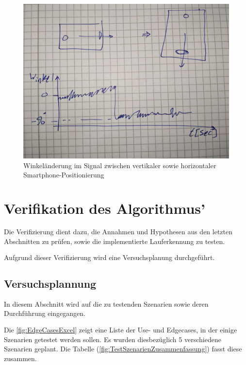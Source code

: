 \begin{figure}[H]
	\centering
	\includegraphics[width=\linewidth]{Bilder/SignalHorizontalUndVertikal.jpg}
	\caption{Winkeländerung im Signal zwischen vertikaler sowie horizontaler Smartphone-Positionierung}
	\label{fig:SignalHorizontalUndVertikal}
\end{figure}



\section{Verifikation des Algorithmus'}
Die Verifizierung dient dazu, die Annahmen und Hypothesen aus den letzten Abschnitten zu prüfen, sowie die implementierte Lauferkennung zu testen.


Aufgrund dieser Verifizierung wird eine Versuchsplanung durchgeführt. 
%
%
%
\subsection{Versuchsplannung}

In diesem Abschnitt wird auf die zu testenden Szenarien sowie deren Durchführung eingegangen.

Die \autoref{fig:EdgeCasesExcel} zeigt eine Liste der Use- und Edgecases, in der einige Szenarien getestet werden sollen. Es wurden diesbezüglich 5 verschiedene Szenarien geplant.
Die Tabelle (\autoref{fig:TestSzenarienZusammenfassung}) fasst diese zusammen.

